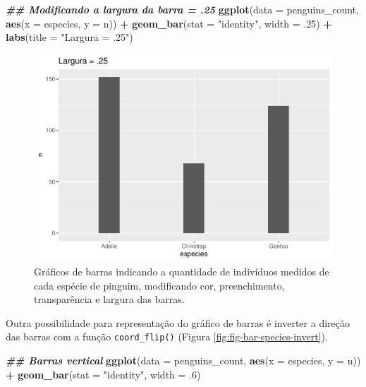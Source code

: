 \documentclass[
]{article}
\newenvironment{Shaded}{\begin{snugshade}}{\end{snugshade}}
\newcommand{\AttributeTok}[1]{\textcolor[rgb]{0.13,0.29,0.53}{#1}}
\newcommand{\DecValTok}[1]{\textcolor[rgb]{0.00,0.00,0.81}{#1}}
\newcommand{\DocumentationTok}[1]{\textcolor[rgb]{0.56,0.35,0.01}{\textbf{\textit{#1}}}}
\newcommand{\FunctionTok}[1]{\textcolor[rgb]{0.13,0.29,0.53}{\textbf{#1}}}
\newcommand{\NormalTok}[1]{#1}
\newcommand{\SpecialCharTok}[1]{\textcolor[rgb]{0.81,0.36,0.00}{\textbf{#1}}}
\newcommand{\StringTok}[1]{\textcolor[rgb]{0.31,0.60,0.02}{#1}}
\begin{document}
\begin{Shaded}
\begin{Highlighting}[]
\DocumentationTok{\#\# Modificando a largura da barra = .25}
\FunctionTok{ggplot}\NormalTok{(}\AttributeTok{data =}\NormalTok{ penguins\_count, }\FunctionTok{aes}\NormalTok{(}\AttributeTok{x =}\NormalTok{ especies, }\AttributeTok{y =}\NormalTok{ n)) }\SpecialCharTok{+}
    \FunctionTok{geom\_bar}\NormalTok{(}\AttributeTok{stat =} \StringTok{"identity"}\NormalTok{, }\AttributeTok{width =}\NormalTok{ .}\DecValTok{25}\NormalTok{) }\SpecialCharTok{+}
    \FunctionTok{labs}\NormalTok{(}\AttributeTok{title =} \StringTok{"Largura = .25"}\NormalTok{) }
\end{Highlighting}
\end{Shaded}

\begin{figure}
\includegraphics[width=0.75\linewidth,height=0.75\textheight]{epr_files/figure-latex/fig-bar-species-color-4} \caption{Gráficos de barras indicando a quantidade de indivíduos medidos de cada espécie de pinguim, modificando cor, preenchimento, transparência e largura das barras.}\label{fig:fig-bar-species-color-4}
\end{figure}

Outra possibilidade para representação do gráfico de barras é inverter a direção das barras com a função \texttt{coord\_flip()} (Figura \ref{fig:fig-bar-species-invert}).

\begin{Shaded}
\begin{Highlighting}[]
\DocumentationTok{\#\# Barras vertical}
\FunctionTok{ggplot}\NormalTok{(}\AttributeTok{data =}\NormalTok{ penguins\_count, }\FunctionTok{aes}\NormalTok{(}\AttributeTok{x =}\NormalTok{ especies, }\AttributeTok{y =}\NormalTok{ n)) }\SpecialCharTok{+}
    \FunctionTok{geom\_bar}\NormalTok{(}\AttributeTok{stat =} \StringTok{"identity"}\NormalTok{, }\AttributeTok{width =}\NormalTok{ .}\DecValTok{6}\NormalTok{)}
\end{Highlighting}
\end{Shaded}
\end{document}
